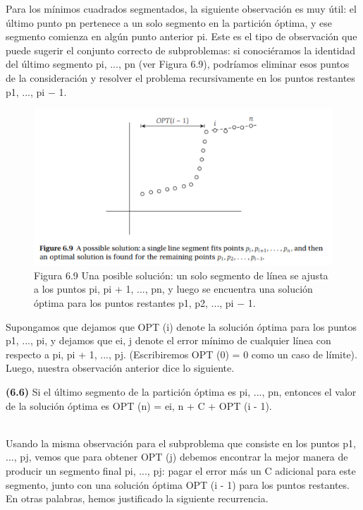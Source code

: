\documentclass[a4paper]{article}
\begin{document}
Para los mínimos cuadrados segmentados, la siguiente observación es muy útil: el último punto pn pertenece a un solo segmento en la partición óptima, y ​​ese segmento comienza en algún punto anterior pi. Este es el tipo de observación que puede sugerir el conjunto correcto de subproblemas: si conociéramos la identidad del último segmento pi, ..., pn (ver Figura 6.9), podríamos eliminar esos puntos de la consideración y resolver el problema recursivamente en los puntos restantes p1, ..., pi − 1.\\


\begin{figure}

\centering
\includegraphics[scale=1]{Imagenes-Seccion6/fig6_9.PNG}
\caption{Figura 6.9 Una posible solución: un solo segmento de línea se ajusta a los puntos pi, pi + 1, ..., pn, y luego se encuentra una solución óptima para los puntos restantes p1, p2, ..., pi − 1.}

\end{figure}

Supongamos que dejamos que OPT (i) denote la solución óptima para los puntos p1, ..., pi, y dejamos que ei, j denote el error mínimo de cualquier línea con respecto a pi, pi + 1, ..., pj. (Escribiremos OPT (0) = 0 como un caso de límite). Luego, nuestra observación anterior dice lo siguiente.\\

\colorbox{mygray}{\parbox{15cm}{
\textbf{(6.6)} Si el último segmento de la partición óptima es pi, ..., pn, entonces el valor de la solución óptima es OPT (n) = ei, n + C + OPT (i - 1).}}\\

Usando la misma observación para el subproblema que consiste en los puntos p1, ..., pj, vemos que para obtener OPT (j) debemos encontrar la mejor manera de producir un segmento final pi, ..., pj: pagar el error más un C adicional para este segmento, junto con una solución óptima OPT (i - 1) para los puntos restantes. En otras palabras, hemos justificado la siguiente recurrencia.\\
\end{document}
